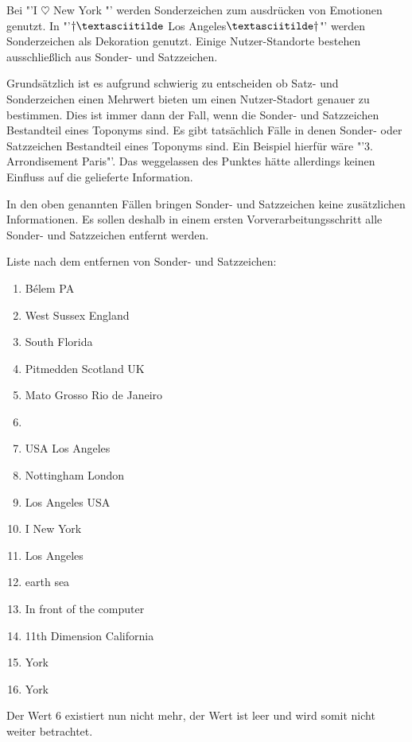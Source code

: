 				Bei "'I $\heartsuit$ New York "' werden Sonderzeichen zum ausdrücken von Emotionen genutzt.
				In "'$\dagger\textasciitilde$ Los Angeles$\textasciitilde\dagger$"' werden Sonderzeichen als Dekoration genutzt.
				Einige Nutzer-Standorte bestehen ausschließlich aus Sonder- und Satzzeichen.
				
				Grundsätzlich ist es aufgrund schwierig zu entscheiden ob Satz- und Sonderzeichen einen Mehrwert bieten um einen Nutzer-Stadort genauer zu bestimmen.
				Dies ist immer dann der Fall, wenn die Sonder- und Satzzeichen Bestandteil eines Toponyms sind. 
				Es gibt tatsächlich Fälle in denen Sonder- oder Satzzeichen Bestandteil eines Toponyms sind.
				Ein Beispiel hierfür wäre "'3. Arrondisement Paris"'.
				Das weggelassen des Punktes hätte allerdings keinen Einfluss auf die gelieferte Information.

				In den oben genannten Fällen bringen Sonder- und Satzzeichen keine zusätzlichen Informationen.
				Es sollen deshalb in einem ersten Vorverarbeitungsschritt alle Sonder- und Satzzeichen entfernt werden. 

				Liste nach dem entfernen von Sonder- und Satzzeichen:

				\begin{multicols}{2}
					\begin{enumerate}
						\item Bélem PA
						\item West Sussex England
						\item South Florida
						\item Pitmedden Scotland UK
						\item Mato Grosso Rio de Janeiro
						\item 
						\item USA Los Angeles
						\item Nottingham London
						\item Los Angeles USA
						\item I New York 
						\item Los Angeles
						\item earth sea
						\item In front of the computer
						\item 11th Dimension California
						\item York
						\item York
					\end{enumerate}
				\end{multicols}

				Der Wert 6 existiert nun nicht mehr, der Wert ist leer und wird somit nicht weiter betrachtet.

